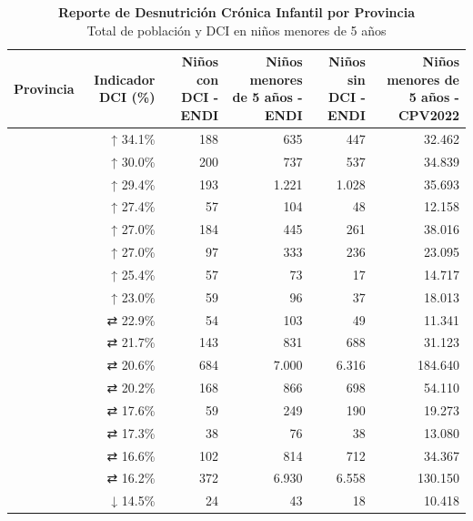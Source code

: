 \documentclass[
  letterpaper,
  DIV=11,
  numbers=noendperiod]{scrreprt}
\begin{document}
\begin{table}
\caption*{
{\large \textbf{Reporte de Desnutrición Crónica Infantil por Provincia}} \\ 
{\small Total de población y DCI en niños menores de 5 años}
} 
\fontsize{10.5pt}{12.6pt}\selectfont
\begin{tabular*}{\linewidth}{@{\extracolsep{\fill}}lrrrrr}
\toprule
Provincia & Indicador DCI (\%) & Niños con DCI - ENDI & Niños menores de 5 años - ENDI & Niños sin DCI - ENDI & Niños menores de 5 años - CPV2022 \\ 
\midrule\addlinespace[2.5pt]
{\cellcolor[HTML]{E0F7FA}{CHIMBORAZO}} & ↑ 34.1\% & 188 & 635 & 447 & 32.462 \\ 
{\cellcolor[HTML]{E0F7FA}{SANTA ELENA}} & ↑ 30.0\% & 200 & 737 & 537 & 34.839 \\ 
{\cellcolor[HTML]{E0F7FA}{COTOPAXI}} & ↑ 29.4\% & 193 & 1.221 & 1.028 & 35.693 \\ 
{\cellcolor[HTML]{E0F7FA}{PASTAZA}} & ↑ 27.4\% & 57 & 104 & 48 & 12.158 \\ 
{\cellcolor[HTML]{E0F7FA}{TUNGURAHUA}} & ↑ 27.0\% & 184 & 445 & 261 & 38.016 \\ 
{\cellcolor[HTML]{E0F7FA}{MORONA SANTIAGO}} & ↑ 27.0\% & 97 & 333 & 236 & 23.095 \\ 
{\cellcolor[HTML]{E0F7FA}{BOLÍVAR}} & ↑ 25.4\% & 57 & 73 & 17 & 14.717 \\ 
{\cellcolor[HTML]{E0F7FA}{CAÑAR}} & ↑ 23.0\% & 59 & 96 & 37 & 18.013 \\ 
{\cellcolor[HTML]{E0F7FA}{CARCHI}} & ⇄ 22.9\% & 54 & 103 & 49 & 11.341 \\ 
{\cellcolor[HTML]{E0F7FA}{IMBABURA}} & ⇄ 21.7\% & 143 & 831 & 688 & 31.123 \\ 
{\cellcolor[HTML]{E0F7FA}{PICHINCHA}} & ⇄ 20.6\% & 684 & 7.000 & 6.316 & 184.640 \\ 
{\cellcolor[HTML]{E0F7FA}{AZUAY}} & ⇄ 20.2\% & 168 & 866 & 698 & 54.110 \\ 
{\cellcolor[HTML]{E0F7FA}{ORELLANA}} & ⇄ 17.6\% & 59 & 249 & 190 & 19.273 \\ 
{\cellcolor[HTML]{E0F7FA}{NAPO}} & ⇄ 17.3\% & 38 & 76 & 38 & 13.080 \\ 
{\cellcolor[HTML]{E0F7FA}{LOJA}} & ⇄ 16.6\% & 102 & 814 & 712 & 34.367 \\ 
{\cellcolor[HTML]{E0F7FA}{MANABÍ}} & ⇄ 16.2\% & 372 & 6.930 & 6.558 & 130.150 \\ 
{\cellcolor[HTML]{E0F7FA}{ZAMORA CHINCHIPE}} & ↓ 14.5\% & 24 & 43 & 18 & 10.418 \\ 

\end{tabular*}
\end{table}
\end{document}
